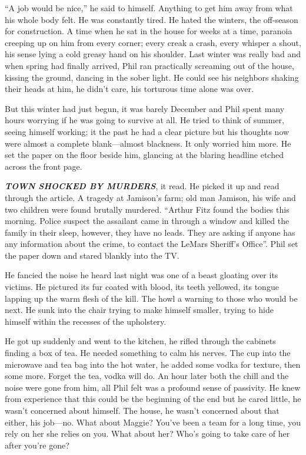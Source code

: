 \documentclass[
]{article}
\begin{document}
``A job would be nice,'' he said to himself. Anything to get him away
from what his whole body felt. He was constantly tired. He hated the
winters, the off-season for construction. A time when he sat in the
house for weeks at a time, paranoia creeping up on him from every
corner; every creak a crash, every whisper a shout, his sense lying a
cold greasy hand on his shoulder. Last winter was really bad and when
spring had finally arrived, Phil ran practically screaming out of the
house, kissing the ground, dancing in the sober light. He could see his
neighbors shaking their heads at him, he didn't care, his torturous time
alone was over.

But this winter had just begun, it was barely December and Phil spent
many hours worrying if he was going to survive at all. He tried to think
of summer, seeing himself working; it the past he had a clear picture
but his thoughts now were almost a complete blank---almost blackness. It
only worried him more. He set the paper on the floor beside him,
glancing at the blaring headline etched across the front page.

\textbf{\emph{TOWN SHOCKED BY MURDERS}}, it read. He picked it up and
read through the article. A tragedy at Jamison's farm; old man Jamison,
his wife and two children were found brutally murdered. ``Arthur Fitz
found the bodies this morning. Police suspect the assailant came in
through a window and killed the family in their sleep, however, they
have no leads. They are asking if anyone has any information about the
crime, to contact the LeMars Sheriff's Office''. Phil set the paper down
and stared blankly into the TV.

He fancied the noise he heard last night was one of a beast gloating
over its victims. He pictured its fur coated with blood, its teeth
yellowed, its tongue lapping up the warm flesh of the kill. The howl a
warning to those who would be next. He sunk into the chair trying to
make himself smaller, trying to hide himself within the recesses of the
upholstery.

He got up suddenly and went to the kitchen, he rifled through the
cabinets finding a box of tea. He needed something to calm his nerves.
The cup into the microwave and tea bag into the hot water, he added some
vodka for texture, then some more. Forget the tea, vodka will do. An
hour later both the chill and the noise were gone from him, all Phil
felt was a profound sense of passivity. He knew from experience that
this could be the beginning of the end but he cared little, he wasn't
concerned about himself. The house, he wasn't concerned about that
either, his job---no. What about Maggie? You've been a team for a long
time, you rely on her she relies on you. What about her? Who's going to
take care of her after you're gone?
\end{document}
